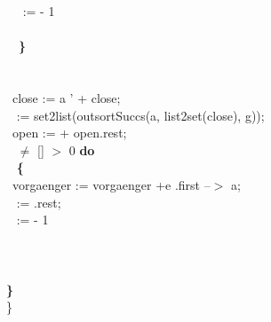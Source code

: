 \tabbe \tabif\ \tabbe \tabif\ \tabbe {}\tabbe {} :=  - 1\\
\tabbe \tabif\ \tabbe \tabif\ \tabbe {}\\
\tabbe \tabif\ \tabbe \tabif\ {\bf \}}\\
\tabbe \tabif\ \\
\tabbe \tabif\ \tabbe  {\bf \{}\\
\tabbe \tabif\ \tabbe \tabbe close := a ' + close;\\
\tabbe \tabif\ \tabbe \tabbe {} := set2list(outsortSuccs(a, list2set(close), g));\\
\tabbe \tabif\ \tabbe \tabbe open :=  + open.rest;\\
\tabbe \tabif\ \tabbe {}  $\neq$ [] \And {} $>$ 0 {\bf do}\\
\tabbe \tabif\ \tabbe \tabbe {} {\bf \{}\\
\tabbe \tabif\ \tabbe \tabbe {}\tabbe vorgaenger := vorgaenger +e .first --$>$ a;\\
\tabbe \tabif\ \tabbe \tabbe {}\tabbe {} := .rest;\\
\tabbe \tabif\ \tabbe \tabbe {}\tabbe {} :=  - 1\\
\tabbe \tabif\ \tabbe \tabbe {}\\
\tabbe \tabif\ \tabbe {\bf \}}\\
\tabbe \tabif\ \\
{\bf \}}\\
\}

\bigskip



\par\mbox{}\hrulefill\mbox{}\par